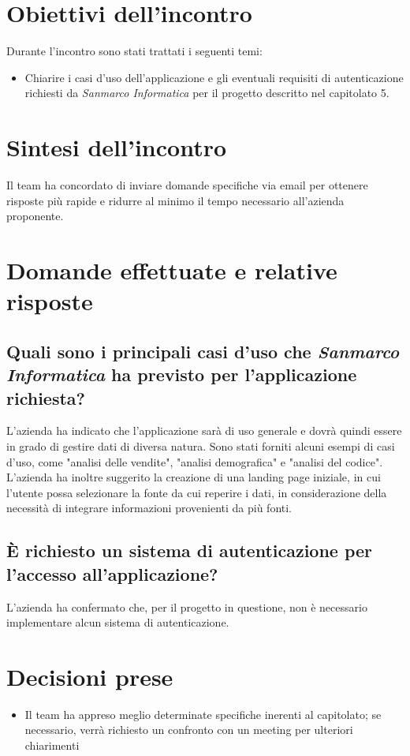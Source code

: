 \documentclass[italian, 12pt]{article}
\begin{document}
\section{Obiettivi dell'incontro}
Durante l'incontro sono stati trattati i seguenti temi:
\begin{itemize}
    \item Chiarire i casi d'uso dell'applicazione e gli eventuali requisiti di autenticazione richiesti da \textit{Sanmarco Informatica} per il progetto descritto nel capitolato 5.
\end{itemize}

\section{Sintesi dell'incontro}
Il team ha concordato di inviare domande specifiche via email per ottenere risposte più rapide e ridurre al minimo il tempo necessario all'azienda proponente.

\section{Domande effettuate e relative risposte}

\subsection{Quali sono i principali casi d'uso che \textit{Sanmarco Informatica} ha previsto per l'applicazione richiesta?}
L'azienda ha indicato che l'applicazione sarà di uso generale e dovrà quindi essere in grado di gestire dati di diversa natura. Sono stati forniti alcuni esempi di casi d'uso, come "analisi delle vendite", "analisi demografica" e "analisi del codice". L'azienda ha inoltre suggerito la creazione di una landing page iniziale, in cui l'utente possa selezionare la fonte da cui reperire i dati, in considerazione della necessità di integrare informazioni provenienti da più fonti.

\subsection{È richiesto un sistema di autenticazione per l'accesso all'applicazione?}
L'azienda ha confermato che, per il progetto in questione, non è necessario implementare alcun sistema di autenticazione.

\section{Decisioni prese}
\begin{itemize}
    \item Il team ha appreso meglio determinate specifiche inerenti al capitolato; se necessario, verrà richiesto un confronto con un meeting per ulteriori chiarimenti
\end{itemize}
\end{document}
